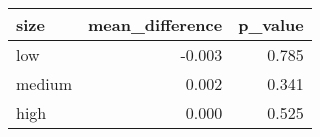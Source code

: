 
\begin{tabular}{lrr}
\toprule
size & mean\_difference & p\_value\\
\midrule
low & -0.003 & 0.785\\
medium & 0.002 & 0.341\\
high & 0.000 & 0.525\\
\bottomrule
\end{tabular}
